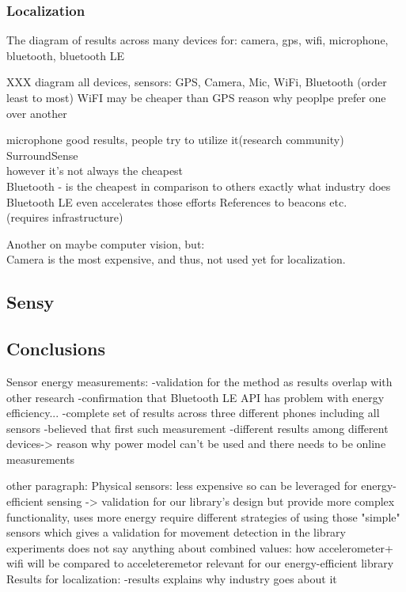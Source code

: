 		
\subsubsection{Localization}

The diagram of results across many devices for: camera, gps, wifi, microphone, bluetooth, bluetooth LE

XXX diagram all devices, sensors: GPS, Camera, Mic, WiFi, Bluetooth (order least to most)
WiFI may be cheaper than GPS
	reason why peoplpe prefer one over another				
				
microphone good results, people try to utilize it(research community)\\
				SurroundSense \cite{azizyan:surroundsense}\\
				however it's not always the cheapest\\
	
Bluetooth - is the cheapest in comparison to others
				exactly what industry does\\
				Bluetooth LE even accelerates those efforts
				References to beacons etc.\\
				(requires infrastructure)
				
Another on maybe computer vision, but:				\\
	Camera is the most expensive, and thus, not used yet for localization.\\
	
			
								
\subsection{Sensy}
\subsection{Conclusions}
Sensor energy measurements:
	-validation for the method
			as results overlap with other research
	-confirmation that Bluetooth LE API has problem with energy efficiency...
	-complete set of results across three different phones including all sensors
		-believed that first such measurement
	-different results among different devices-> reason why power model can't be used and there needs to be online measurements

other paragraph:
	Physical sensors:
		less expensive so can be leveraged for energy-efficient sensing
			-> validation for our library's design
		but provide more complex functionality, uses more energy
			require different strategies of using those "simple" sensors
				which gives a validation for movement detection in the library
		experiments does not say anything about combined values:
			how accelerometer+ wifi will be compared to acceleteremetor
				relevant for our energy-efficient library
	Results for localization: 
		-results explains why industry goes about it
